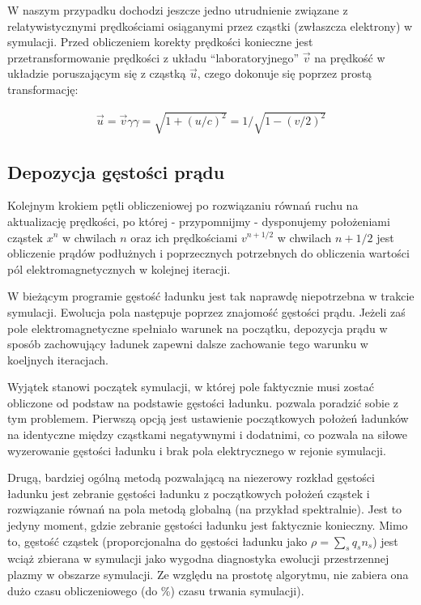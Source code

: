     W naszym przypadku dochodzi jeszcze jedno utrudnienie związane z
    relatywistycznymi prędkościami osiąganymi przez cząstki (zwłaszcza
    elektrony) w symulacji. Przed obliczeniem korekty prędkości konieczne jest
    przetransformowanie prędkości z układu ``laboratoryjnego'' $\vec{v}$ na
    prędkość w układzie poruszającym się z cząstką $\vec{u}$, czego dokonuje
    się poprzez prostą transformację:

    \begin{align}
        \vec{u} = \vec{v} \gamma
        \gamma = \sqrt{1+{(u/c)}^2} = 1/\sqrt{1-{(v/2)}^2}
        \label{eqn:gamma-transformation}
    \end{align}

    \subsection{Depozycja gęstości prądu}

    Kolejnym krokiem pętli obliczeniowej po rozwiązaniu równań ruchu na
    aktualizację prędkości, po której - przypomnijmy - dysponujemy położeniami
    cząstek $x^n$ w chwilach $n$ oraz ich prędkościami $v^{n+1/2}$ w chwilach
    $n+1/2$   jest obliczenie prądów podłużnych i
    poprzecznych potrzebnych do obliczenia wartości pól elektromagnetycznych w
    kolejnej iteracji.

    W bieżącym programie gęstość ładunku jest tak naprawdę niepotrzebna w
    trakcie symulacji. Ewolucja pola następuje poprzez znajomość gęstości prądu.
    Jeżeli zaś pole elektromagnetyczne spełniało warunek  na początku, depozycja prądu w sposób zachowujący ładunek zapewni
    dalsze zachowanie tego warunku w koeljnych iteracjach.

    Wyjątek stanowi początek symulacji, w której pole faktycznie musi zostać
    obliczone od podstaw na podstawie gęstości ładunku.  pozwala
    poradzić sobie z tym problemem. Pierwszą opcją jest ustawienie początkowych
    położeń ładunków na identyczne między cząstkami negatywnymi i dodatnimi, co
    pozwala na siłowe wyzerowanie gęstości ładunku i brak pola elektrycznego w
    rejonie symulacji.

    Drugą, bardziej ogólną metodą pozwalającą na niezerowy rozkład gęstości
    ładunku  jest zebranie gęstości ładunku z początkowych położeń cząstek i
    rozwiązanie równań na pola metodą globalną (na przykład spektralnie). Jest
    to jedyny moment, gdzie zebranie gęstości ładunku jest faktycznie konieczny.
    Mimo to, gęstość cząstek (proporcjonalna do gęstości ładunku jako $\rho =
    \sum_s q_s n_s$) jest wciąż zbierana w symulacji jako wygodna diagnostyka
    ewolucji przestrzennej plazmy w obszarze symulacji. Ze względu na prostotę
    algorytmu, nie zabiera ona dużo czasu obliczeniowego (do
    \%) czasu trwania symulacji).


